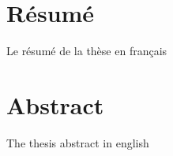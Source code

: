 \chapter*{Résumé}
Le résumé de la thèse en français


\chapter*{Abstract}
The thesis abstract in english

